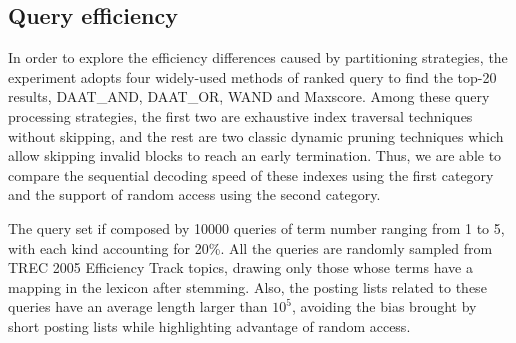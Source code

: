 \documentclass[runningheads,a4paper]{llncs}
\begin{document}
\subsection{Query efficiency}

In order to explore the efficiency differences caused by partitioning strategies, the experiment adopts four widely-used methods of ranked query to find the top-20 results, DAAT\_AND, DAAT\_OR, WAND and Maxscore.
Among these query processing strategies, the first two are exhaustive index traversal techniques without skipping, and the rest are two classic dynamic pruning techniques which allow skipping invalid blocks to reach an early termination.
Thus, we are able to compare the sequential decoding speed of these indexes using the first category and the support of random access using the second category.

The query set if composed by 10000 queries of term number ranging from 1 to 5, with each kind accounting for 20\%.
All the queries are randomly sampled from TREC 2005 Efficiency Track topics, drawing only those whose terms have a mapping in the lexicon after stemming.
Also, the posting lists related to these queries have an average length larger than $ 10^5 $, avoiding the bias brought by short posting lists while highlighting advantage of random access.
\end{document}
